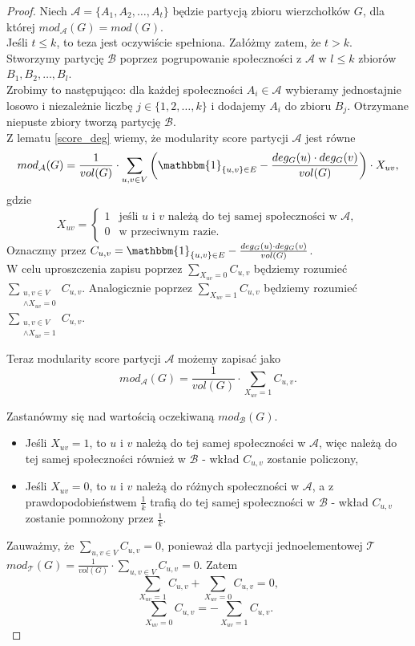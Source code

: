 \documentclass[letterpaper,12pt]{article}
\begin{document}
\begin{proof}
  Niech \(\mathcal{A} = \{A_1, A_2, \ldots, A_t\}\) będzie partycją zbioru wierzchołków \(G\), dla której \(mod_{\mathcal{A}}(G) = mod(G)\).\\
  Jeśli \(t \leq k\), to teza jest oczywiście spełniona. Załóżmy zatem, że \(t > k\).\\
  Stworzymy partycję \(\mathcal{B}\) poprzez pogrupowanie społeczności z \(\mathcal{A}\) w \(l \leq k\) zbiorów \(B_1, B_2, \ldots, B_l\).\\
  Zrobimy to następująco: dla każdej społeczności \(A_i \in \mathcal{A}\) wybieramy jednostajnie losowo i niezależnie liczbę \(j \in \{1, 2, \ldots, k\}\) i dodajemy \(A_i\) do zbioru \(B_j\). Otrzymane niepuste zbiory tworzą partycję \(\mathcal{B}\).\\

  Z lematu \ref{score_deg} wiemy, że modularity score partycji \(\mathcal{A}\) jest równe
  \[
    mod_{\mathcal{A}}(G) = \frac{1}{vol(G)} \cdot \sum_{u,v \in V} \left( \mathbbm{1}_{\{u,v\} \in E} - \frac{deg_G(u) \cdot deg_G(v)}{vol(G)}\right) \cdot X_{uv},
  \]
  gdzie
  \[
    X_{uv} = \begin{cases}
      1 & \text{jeśli } u \text{ i } v \text{ należą do tej samej społeczności w } \mathcal{A}, \\
      0 & \text{w przeciwnym razie.}
    \end{cases}
  \]
  Oznaczmy przez \(C_{u,v} = \mathbbm{1}_{\{u,v\} \in E} - \frac{deg_G(u) \cdot deg_G(v)}{vol(G)}\).\\
  W celu uproszczenia zapisu poprzez \(\sum_{X_{uv} = 0} C_{u,v}\) będziemy rozumieć \(\sum_{\substack{u,v \in V \\\land X_{uv} = 0}} C_{u,v}\). Analogicznie poprzez \(\sum_{X_{uv} = 1} C_{u,v}\) będziemy rozumieć \(\sum_{\substack{u,v \in V \\\land X_{uv} = 1}} C_{u,v}\).

  Teraz modularity score partycji \(\mathcal{A}\) możemy zapisać jako
  \[
    mod_{\mathcal{A}}(G) = \frac{1}{vol(G)} \cdot \sum_{X_{uv} = 1} C_{u,v}.
  \]

  Zastanówmy się nad wartością oczekiwaną \(mod_{\mathcal{B}}(G)\).
  \begin{itemize}
    \item Jeśli \(X_{uv} = 1\), to \(u\) i \(v\) należą do tej samej społeczności w \(\mathcal{A}\), więc należą do tej samej społeczności również w \(\mathcal{B}\) - wkład \(C_{u,v}\) zostanie policzony,
    \item Jeśli \(X_{uv} = 0\), to \(u\) i \(v\) należą do różnych społeczności w \(\mathcal{A}\), a z prawdopodobieństwem \(\frac{1}{k}\) trafią do tej samej społeczności w \(\mathcal{B}\) - wkład \(C_{u,v}\) zostanie pomnożony przez \(\frac{1}{k}\).
  \end{itemize}
  Zauważmy, że \(\sum_{u,v \in V} C_{u,v} = 0\), ponieważ dla partycji jednoelementowej \(\mathcal{T}\)\\\(mod_{\mathcal{T}}(G) = \frac{1}{vol(G)} \cdot \sum_{u,v \in V} C_{u,v} = 0\). Zatem
  \[\sum_{X_{uv} = 1} C_{u,v} + \sum_{X_{uv} = 0} C_{u,v} = 0,\]
  \[\sum_{X_{uv} = 0} C_{u,v} = -\sum_{X_{uv} = 1} C_{u,v}.\]


\end{proof}
\end{document}
